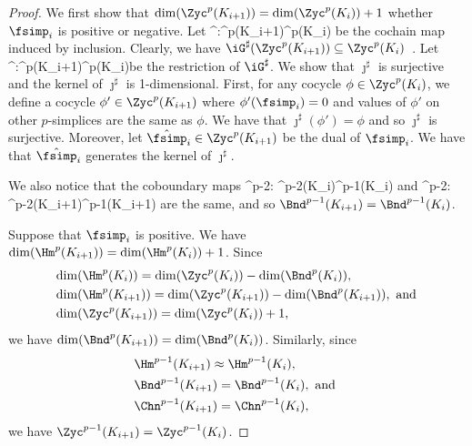 \begin{proof}
We first show that $\dim(\Zyc^p(K_{i+1}))=\dim(\Zyc^p(K_{i}))+1$
whether $\fsimp_i$ is positive or negative.
Let \mbeg\iG^\sharp:\Chn^p(K_{i+1})\to\Chn^p(K_{i})\mend
be the cochain map induced by inclusion.
Clearly, we have  $\iG^\sharp(\Zyc^p(K_{i+1}))\subseteq\Zyc^p(K_{i})$~\cite{hatcher2002algebraic}.
Let \mbeg\jmath^\sharp:\Zyc^p(K_{i+1})\to\Zyc^p(K_{i})\mend be the restriction of $\iG^\sharp$.
We show that $\jmath^\sharp$ is surjective
and the kernel of $\jmath^\sharp$ is 1-dimensional.
First, for any cocycle $\phi\in\Zyc^p(K_{i})$,
we define a cocycle $\phi'\in\Zyc^p(K_{i+1})$
where $\phi'(\fsimp_i)=0$
and values of $\phi'$ on other $p$-simplices are
the same as $\phi$.
We have that $\jmath^\sharp(\phi')=\phi$ and so $\jmath^\sharp$
is surjective.
Moreover, let $\hat{\fsimp}_i\in\Zyc^p(K_{i+1})$ be 
the dual of $\fsimp_i$.
We have that $\hat{\fsimp}_i$ generates 
the kernel of $\jmath^\sharp$.

We also notice that the coboundary maps \mbeg\dG^{p-2}: \Chn^{p-2}(K_i)\to \Chn^{p-1}(K_i)\mend
   and \mbeg\dG^{p-2}: \Chn^{p-2}(K_{i+1})\to \Chn^{p-1}(K_{i+1})\mend
   are the same, and so $\Bnd^{p-1}(K_{i+1})=\Bnd^{p-1}(K_{i})$.

Suppose that $\fsimp_i$ is positive.
We have  $\dim(\Hm^p(K_{i+1}))=\dim(\Hm^p(K_{i}))+1$.
Since 
\begin{align*}
&\dim(\Hm^p(K_{i}))=\dim(\Zyc^p(K_{i}))-\dim(\Bnd^p(K_{i})),\\
&\dim(\Hm^p(K_{i+1}))=\dim(\Zyc^p(K_{i+1}))-\dim(\Bnd^p(K_{i+1})),
\text{ and }\\
&\dim(\Zyc^p(K_{i+1}))=\dim(\Zyc^p(K_{i}))+1,
\end{align*}
we have $\dim(\Bnd^p(K_{i+1}))=\dim(\Bnd^p(K_{i}))$.
Similarly, since
\begin{align*}
&\Hm^{p-1}(K_{i+1})\approx\Hm^{p-1}(K_{i}),\\
&\Bnd^{p-1}(K_{i+1})=\Bnd^{p-1}(K_{i}),
\text{ and }\\
&\Chn^{p-1}(K_{i+1})=\Chn^{p-1}(K_{i}),
\end{align*}
we have $\Zyc^{p-1}(K_{i+1})=\Zyc^{p-1}(K_{i})$.


\end{proof}
